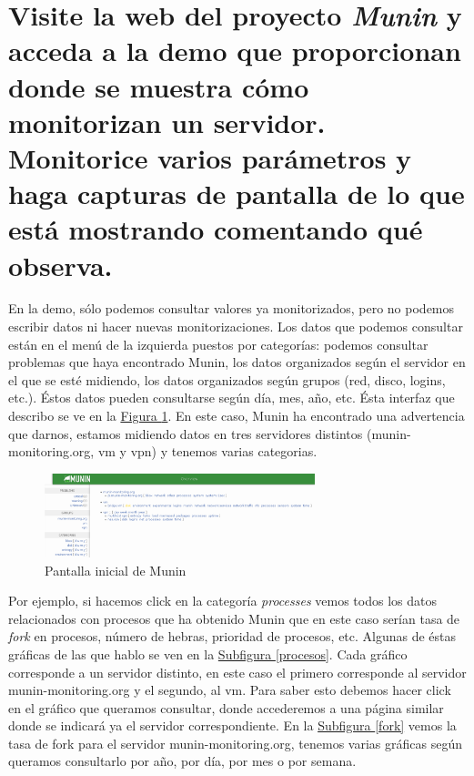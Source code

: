 \documentclass[10pt,a4paper,spanish]{article}
\numberwithin{equation}{section} %
\numberwithin{figure}{section} %
\numberwithin{table}{section} %
\begin{document}
\section{Visite la web del proyecto \textit{Munin} y acceda a la demo que proporcionan donde se muestra cómo monitorizan un servidor. Monitorice varios parámetros y haga capturas de pantalla de lo que está mostrando comentando qué observa.}
En la demo, sólo podemos consultar valores ya monitorizados, pero no podemos escribir datos ni hacer nuevas monitorizaciones. Los datos que podemos consultar están en el menú de la izquierda puestos por categorías: podemos consultar problemas que haya encontrado Munin, los datos organizados según el servidor en el que se esté midiendo, los datos organizados según grupos (red, disco, logins, etc.). Éstos datos pueden consultarse según día, mes, año, etc. Ésta interfaz que describo se ve en la \hyperref[iniciomunin]{Figura \ref*{iniciomunin}}. En este caso, Munin ha encontrado una advertencia que darnos, estamos midiendo datos en tres servidores distintos (munin-monitoring.org, vm y vpn) y tenemos varias categorias.

\begin{figure}[!h]
    \centering
    \includegraphics[width=0.7\textwidth]{20}
    \caption{Pantalla inicial de Munin}
    \label{iniciomunin}
\end{figure}

Por ejemplo, si hacemos click en la categoría \textit{processes} vemos todos los datos relacionados con procesos que ha obtenido Munin que en este caso serían tasa de \textit{fork} en procesos, número de hebras, prioridad de procesos, etc. Algunas de éstas gráficas de las que hablo se ven en la \hyperref[procesos]{Subfigura \ref*{procesos}}. Cada gráfico corresponde a un servidor distinto, en este caso el primero corresponde al servidor munin-monitoring.org y el segundo, al vm. Para saber esto debemos hacer click en el gráfico que queramos consultar, donde accederemos a una página similar donde se indicará ya el servidor correspondiente. En la \hyperref[fork]{Subfigura \ref*{fork}} vemos la tasa de fork para el servidor munin-monitoring.org, tenemos varias gráficas según queramos consultarlo por año, por día, por mes o por semana.
\end{document}
